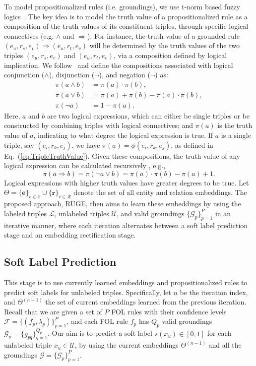 \documentclass[letterpaper]{article} \usepackage{aaai18}  \usepackage{times}  \usepackage{helvet}  \usepackage{courier}  \usepackage{url}  \usepackage{graphicx}  \usepackage{amsmath}
\begin{document}
To model propositionalized rules (i.e. groundings), we use t-norm based fuzzy logics~\cite{hajek1998:FuzzyLogic}. The key idea is to model the truth value of a propositionalized rule as a composition of the truth values of its constituent triples, through specific logical connectives (e.g. $\wedge$ and $\Rightarrow$). For instance, the truth value of a grounded rule $(e_u, r_s, e_v) \Rightarrow (e_u, r_t, e_v)$ will be determined by the truth values of the two triples $(e_u, r_s, e_v)$ and $(e_u, r_t, e_v)$, via a composition defined by logical implication. We follow~\cite{guo2016:KALE} and define the compositions associated with logical conjunction ($\wedge$), disjunction ($\neg$), and negation ($\neg$) as:
\begin{align}
  \pi(a \wedge b) & = \pi(a) \cdot \pi(b), \\
  \pi(a \vee b)   & = \pi(a) + \pi(b) - \pi(a) \cdot \pi(b), \\
  \pi(\neg a)     & = 1 - \pi(a).
\end{align}
Here, $a$ and $b$ are two logical expressions, which can either be single triples or be constructed by combining triples with logical connectives; and $\pi(a)$ is the truth value of $a$, indicating to what degree the logical expression is true. If $a$ is a single triple, say $(e_i,r_k,e_j)$, we have $\pi(a)=\phi(e_i, r_k, e_j)$, as defined in Eq.~(\ref{eq:TripleTruthValue}). Given these compositions, the truth value of any logical expression can be calculated recursively \cite{guo2016:KALE}, e.g.,
\begin{equation}\label{eq:Implication}
\pi(a \Rightarrow b) = \pi(\neg a \vee b) = \pi(a) \cdot \pi(b) - \pi(a) + 1.
\end{equation}
Logical expressions with higher truth values have greater degrees to be true. Let $\Theta=\{\mathbf{e}\}_{e\in\mathcal{E}}\cup\{\mathbf{r}\}_{r\in\mathcal{R}}$ denote the set of all entity and relation embeddings. The proposed approach, RUGE, then aims to learn these embeddings by using the labeled triples $\mathcal{L}$, unlabeled triples $\mathcal{U}$, and valid groundings $\{\mathcal{G}_p\}_{p=1}^P$ in an iterative manner, where each iteration alternates between a soft label prediction stage and an embedding rectification stage.

\subsection{Soft Label Prediction}
This stage is to use currently learned embeddings and propositionalized rules to predict soft labels for unlabeled triples. Specifically, let $n$ be the iteration index, and $\Theta^{(n-1)}$ the set of current embeddings learned from the previous iteration. Recall that we are given a set of $P$ FOL rules with their confidence levels $\mathcal{F}=\{(f_p,\lambda_p)\}_{p=1}^{P}$, and each FOL rule $f_p$ has $Q_p$ valid groundings $\mathcal{G}_p=\{g_{pq}\}_{q=1}^{Q_p}$. Our aim is to predict a soft label $s(x_u)\in[0,1]$ for each unlabeled triple $x_u\in\mathcal{U}$, by using the current embeddings $\Theta^{(n-1)}$ and all the groundings $\mathcal{G}=\{\mathcal{G}_p\}_{p=1}^P$.
\end{document}
